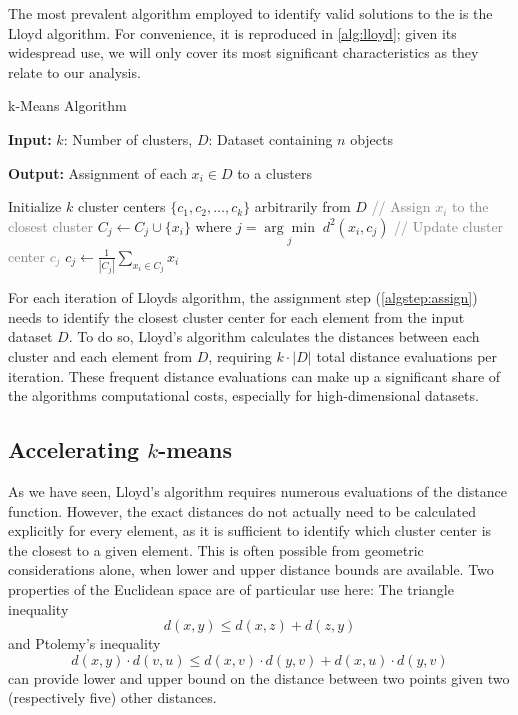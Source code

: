 The most prevalent algorithm employed to identify valid solutions to the \kmeans is the Lloyd algorithm.
For convenience, it is reproduced in \autoref{alg:lloyd};
given its widespread use, we will only cover its most significant characteristics as they relate to our analysis.

\begin{algorithm}
	\caption{k-Means Algorithm}
	\label{alg:lloyd}

	\textbf{Input:} \( k \): Number of clusters, \( D \): Dataset containing \( n \) objects

	\textbf{Output:} Assignment of each $x_i \in D$ to a clusters

	\begin{algorithmic}[1]
		\State Initialize \( k \) cluster centers \( \{c_1, c_2, \dots, c_k\} \) arbitrarily from \( D \)
		\Repeat
		\label{algstep:assign}
		\State \textcolor{gray}{// Assign \( x_i \) to the closest cluster}
		\State \( C_j \leftarrow C_j \cup \{x_i\} \) where \( j = \underset{j}{\arg\min} \; d^2(x_i, c_j) \)
		\EndFor
		\State \textcolor{gray}{// Update cluster center \( c_j \)}
		\State \( c_j \leftarrow \frac{1}{|C_j|} \sum_{x_i \in C_j} x_i \)
		\EndFor
	\end{algorithmic}
\end{algorithm}

For each iteration of Lloyds algorithm, the assignment step (\autoref{algstep:assign}) needs to identify the closest cluster center for each element from the input dataset $D$.
To do so, Lloyd's algorithm calculates the distances between each cluster and each element from $D$, requiring $k\cdot|D|$ total distance evaluations per iteration.
These frequent distance evaluations can make up a significant share of the algorithms computational costs, especially for high-dimensional datasets.

\subsection{Accelerating $k$-means}

As we have seen, Lloyd's algorithm requires numerous evaluations of the distance function.
However, the exact distances do not actually need to be calculated explicitly for every element, as it is sufficient to identify which cluster center is the closest to a given element.
This is often possible from geometric considerations alone, when lower and upper distance bounds are available.
Two properties of the Euclidean space are of particular use here:
The triangle inequality
$$ d(x,y) \leq d(x,z) + d(z,y) $$
and Ptolemy's inequality
$$ d(x, y)\cdot d(v, u) \leq d(x, v) \cdot d(y,v) + d(x, u) \cdot d(y, v)$$
can provide lower and upper bound on the distance between two points given two (respectively five) other distances.

